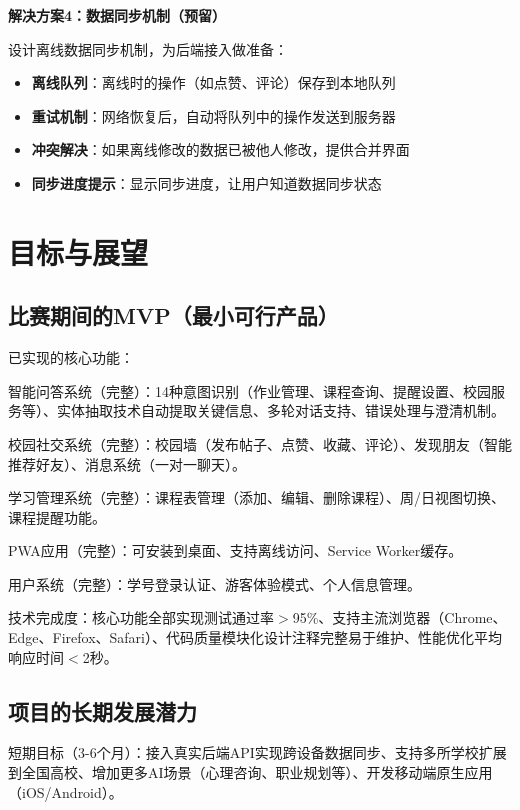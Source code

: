 \documentclass[12pt,a4paper]{article}
\begin{document}
\textbf{解决方案4：数据同步机制（预留）}

设计离线数据同步机制，为后端接入做准备：

\begin{itemize}
    \item \textbf{离线队列}：离线时的操作（如点赞、评论）保存到本地队列
    \item \textbf{重试机制}：网络恢复后，自动将队列中的操作发送到服务器
    \item \textbf{冲突解决}：如果离线修改的数据已被他人修改，提供合并界面
    \item \textbf{同步进度提示}：显示同步进度，让用户知道数据同步状态
\end{itemize}

\section{目标与展望}

\subsection{比赛期间的MVP（最小可行产品）}

已实现的核心功能：

智能问答系统（完整）：14种意图识别（作业管理、课程查询、提醒设置、校园服务等）、实体抽取技术自动提取关键信息、多轮对话支持、错误处理与澄清机制。

校园社交系统（完整）：校园墙（发布帖子、点赞、收藏、评论）、发现朋友（智能推荐好友）、消息系统（一对一聊天）。

学习管理系统（完整）：课程表管理（添加、编辑、删除课程）、周/日视图切换、课程提醒功能。

PWA应用（完整）：可安装到桌面、支持离线访问、Service Worker缓存。

用户系统（完整）：学号登录认证、游客体验模式、个人信息管理。

技术完成度：核心功能全部实现测试通过率$>$95\%、支持主流浏览器（Chrome、Edge、Firefox、Safari）、代码质量模块化设计注释完整易于维护、性能优化平均响应时间$<$2秒。

\subsection{项目的长期发展潜力}

短期目标（3-6个月）：接入真实后端API实现跨设备数据同步、支持多所学校扩展到全国高校、增加更多AI场景（心理咨询、职业规划等）、开发移动端原生应用（iOS/Android）。
\end{document}
